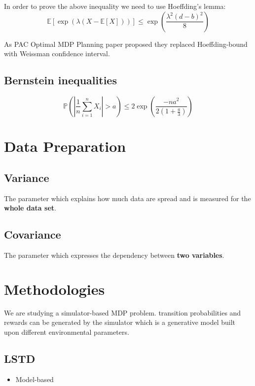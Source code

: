 \documentclass[a4paper,12pt]{article}
\begin{document}
In order to prove the above inequality we need to use Hoeffding's lemma:
\begin{equation}
    \mathbb {E} \left[ \exp \left( {\lambda ( X - \mathbb {E}[X] )} \right)  \right] \leq \exp \left( \frac{\lambda ^ 2 (d-b)^2}{8} \right)
\end{equation}

As PAC Optimal MDP Planning paper \cite{AlkaeeTaleghan2015a} proposed they replaced Hoeffding-bound with Weissman confidence interval.

\subsection{Bernstein inequalities}
\begin{equation}
    \mathbb { P } \left( \left| \frac { 1 } { n } \sum _ { i = 1 } ^ { n } X _ { i } \right| > a \right) \leq 2 \exp \left( \frac {- n a ^ {2} } { 2 \left( 1 + \frac {a} {3} \right) } \right)
\end{equation}

\section{Data Preparation}

\subsection{Variance}
The parameter which explains how much data are spread and is measured for the \textbf{whole data set}.

\subsection{Covariance}
The parameter which expresses the dependency between \textbf{two variables}.

\section{Methodologies}
We are studying a simulator-based MDP problem. transition probabilities and rewards can be generated by the simulator which is a generative model built upon different environmental parameters.

\subsection{LSTD}
\begin{itemize}
    \item Model-based \cite{Boyan1998}
\end{itemize}
\end{document}

